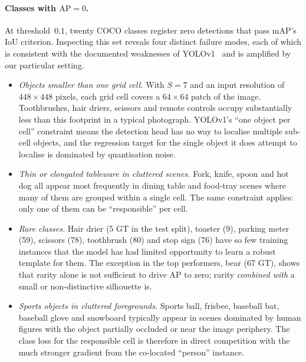 \paragraph{Classes with $\mathrm{AP}=0$.} At threshold~$0.1$, twenty COCO
classes register zero detections that pass mAP's IoU criterion. Inspecting
this set reveals four distinct failure modes, each of which is consistent with
the documented weaknesses of YOLOv1~\citep{redmon2016you} and is amplified by
our particular setting.

\begin{itemize}
    \item \emph{Objects smaller than one grid cell.} With $S=7$ and an input
        resolution of $448\times 448$ pixels, each grid cell covers a
        $64\times 64$ patch of the image. Toothbrushes, hair driers, scissors
        and remote controls occupy substantially less than this footprint in
        a typical photograph. YOLOv1's ``one object per cell'' constraint
        means the detection head has no way to localise multiple sub-cell
        objects, and the regression target for the single object it does
        attempt to localise is dominated by quantisation noise.
    \item \emph{Thin or elongated tableware in cluttered scenes.} Fork,
        knife, spoon and hot dog all appear most frequently in dining table
        and food-tray scenes where many of them are grouped within a single
        cell. The same constraint applies: only one of them can be
        ``responsible'' per cell.
    \item \emph{Rare classes.} Hair drier (5 GT in the test split), toaster
        (9), parking meter (59), scissors (78), toothbrush (80) and stop sign
        (76) have so few training instances that the model has had limited
        opportunity to learn a robust template for them. The exception in the
        top performers, bear (67 GT), shows that rarity alone is not
        sufficient to drive AP to zero; rarity \emph{combined with} a small
        or non-distinctive silhouette is.
    \item \emph{Sports objects in cluttered foregrounds.} Sports ball,
        frisbee, baseball bat, baseball glove and snowboard typically appear
        in scenes dominated by human figures with the object partially
        occluded or near the image periphery. The class loss for the
        responsible cell is therefore in direct competition with the much
        stronger gradient from the co-located ``person'' instance.
\end{itemize}

